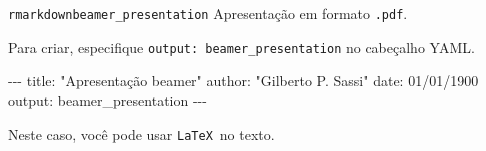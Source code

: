 \documentclass[
  10pt,
  ignorenonframetext,
]{beamer}
\newenvironment{Shaded}{\begin{snugshade}}{\end{snugshade}}
\newcommand{\AttributeTok}[1]{\textcolor[rgb]{0.40,0.45,0.13}{#1}}
\newcommand{\FunctionTok}[1]{\textcolor[rgb]{0.28,0.35,0.67}{#1}}
\newcommand{\KeywordTok}[1]{\textcolor[rgb]{0.00,0.23,0.31}{#1}}
\newcommand{\PreprocessorTok}[1]{\textcolor[rgb]{0.68,0.00,0.00}{#1}}
\newcommand{\StringTok}[1]{\textcolor[rgb]{0.13,0.47,0.30}{#1}}
\begin{document}
\begin{frame}[fragile]{\texttt{rmarkdown}\newline \texttt{beamer\_presentation}}
\protect\hypertarget{rmarkdownbeamer_presentation}{}
Apresentação em formato \texttt{.pdf}.

Para criar, especifique \texttt{output:\ beamer\_presentation} no
cabeçalho YAML.

\begin{Shaded}
\begin{Highlighting}[]
\PreprocessorTok{{-}{-}{-}}
\FunctionTok{title}\KeywordTok{:}\AttributeTok{ }\StringTok{"Apresentação beamer"}
\FunctionTok{author}\KeywordTok{:}\AttributeTok{ }\StringTok{"Gilberto P. Sassi"}
\FunctionTok{date}\KeywordTok{:}\AttributeTok{ 01/01/1900}
\FunctionTok{output}\KeywordTok{:}\AttributeTok{ beamer\_presentation}
\PreprocessorTok{{-}{-}{-}}
\end{Highlighting}
\end{Shaded}

\colorbox{cabecalho}{\textcolor{titulo}{Neste caso, você pode usar \texttt{\LaTeX}\ no texto.}}
\end{frame}
\end{document}
